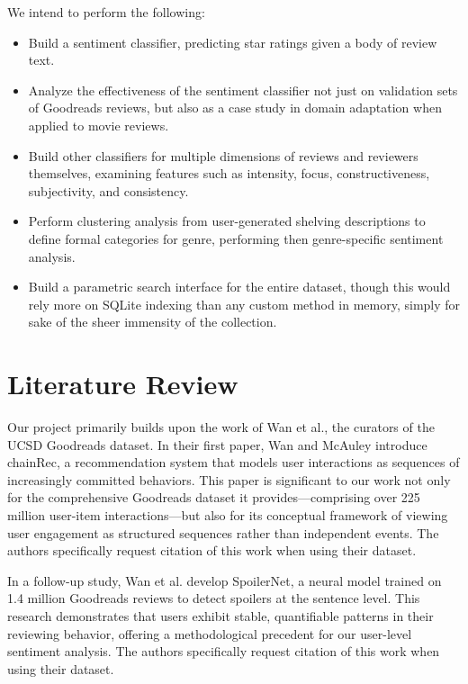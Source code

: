 \documentclass[journal,12pt,onecolumn,draftcls]{IEEEtran}
\begin{document}
We intend to perform the following:

\begin{itemize}
    \item Build a sentiment classifier, predicting star ratings given a body of review text.
    
    \item Analyze the effectiveness of the sentiment classifier not just on validation sets of Goodreads reviews, but also as a case study in domain adaptation when applied to movie reviews.
    
    \item Build other classifiers for multiple dimensions of reviews and reviewers themselves, examining features such as intensity, focus, constructiveness, subjectivity, and consistency.
    
    \item Perform clustering analysis from user-generated shelving descriptions to define formal categories for genre, performing then genre-specific sentiment analysis.
    
    \item Build a parametric search interface for the entire dataset, though this would rely more on SQLite indexing than any custom method in memory, simply for sake of the sheer immensity of the collection.
\end{itemize}

\section{Literature Review}
\label{sec:lit_rev}

Our project primarily builds upon the work of Wan et al., the curators of the UCSD Goodreads dataset. In their first paper, Wan and McAuley \cite{wan2018} introduce chainRec, a recommendation system that models user interactions as sequences of increasingly committed behaviors. This paper is significant to our work not only for the comprehensive Goodreads dataset it provides—comprising over 225 million user-item interactions—but also for its conceptual framework of viewing user engagement as structured sequences rather than independent events. The authors specifically request citation of this work when using their dataset.

In a follow-up study, Wan et al. \cite{wan2019} develop SpoilerNet, a neural model trained on 1.4 million Goodreads reviews to detect spoilers at the sentence level. This research demonstrates that users exhibit stable, quantifiable patterns in their reviewing behavior, offering a methodological precedent for our user-level sentiment analysis. The authors specifically request citation of this work when using their dataset.
\end{document}
